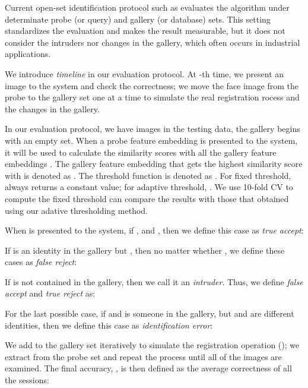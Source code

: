 \documentclass[10pt,twocolumn]{article}
\begin{document}
\vspace{-12pt}
Current open-set identification protocol such as \cite{Klare_2015_CVPR} evaluates the algorithm under determinate probe (or query) and gallery (or database) sets. This setting standardizes the evaluation and makes the result measurable, but it does not consider the intruders nor changes in the gallery, which often occurs in industrial applications. 

We introduce \textit{timeline} in our evaluation protocol. At -th time, we present an image to the system and check the correctness; we move the face image from the probe to the gallery set one at a time to simulate the real registration rocess and the changes in the gallery.




In our evaluation protocol, we have  images in the testing data, the gallery begins with an empty set. When a probe feature embedding  is presented to the system, it will be used to calculate the similarity scores with all the gallery feature embeddings . The gallery feature embedding that gets the highest similarity score with  is denoted as . The threshold function is denoted as . For fixed threshold,  always returns a constant value; for adaptive threshold, .
We use 10-fold CV to compute the fixed threshold can compare the results with those that obtained using our adative thresholding method.

When  is presented to the system, if , and , then we define this case as \textit{true accept}:


If  is an identity in the gallery but , then no matter whether , we define these cases as \textit{false reject}:


If  is not contained in the gallery, then we call it an \textit{intruder}. Thus, we define \textit{false accept} and \textit{true reject} as:



For the last possible case, if  and  is someone in the gallery, but  and  are different identities, then we define this case as \textit{identification error}:


We add  to the gallery set iteratively to simulate the registration operation (); we extract  from the probe set and repeat the process until all of the  images are examined. The final accuracy, , 
is then defined as the average correctness of all the  sessions:
\end{document}
